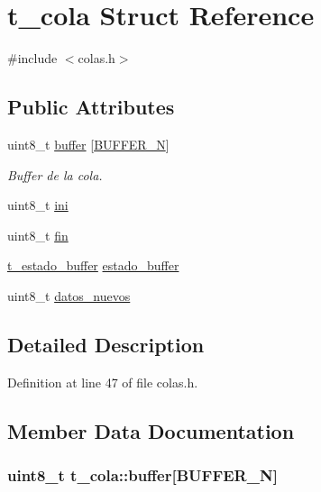 \hypertarget{structt__cola}{}\section{t\+\_\+cola Struct Reference}
\label{structt__cola}


{\ttfamily \#include $<$colas.\+h$>$}

\subsection*{Public Attributes}
\begin{DoxyCompactItemize}
\item 
uint8\+\_\+t \hyperlink{structt__cola_a036c41abaec1f17327ac2c8c797e131b}{buffer} \mbox{[}\hyperlink{colas_8h_ac71c7234de240e3781fe2467040fb3b0}{B\+U\+F\+F\+E\+R\+\_\+N}\mbox{]}
\begin{DoxyCompactList}\small\item\em Buffer de la cola. \end{DoxyCompactList}\item 
uint8\+\_\+t \hyperlink{structt__cola_ad3a0ddb896e8181a52ca74637016f1c7}{ini}
\item 
uint8\+\_\+t \hyperlink{structt__cola_a7a826546e1b03d5efc5ce211cc867008}{fin}
\item 
\hyperlink{colas_8h_adcf7b87b5431386461b2c790e786729a}{t\+\_\+estado\+\_\+buffer} \hyperlink{structt__cola_ad0292a1aa7a79b98d63083ed0d732df6}{estado\+\_\+buffer}
\item 
uint8\+\_\+t \hyperlink{structt__cola_ab28a0c32685544a21076d390d2d9f800}{datos\+\_\+nuevos}
\end{DoxyCompactItemize}


\subsection{Detailed Description}


Definition at line 47 of file colas.\+h.



\subsection{Member Data Documentation}
\subsubsection[{\texorpdfstring{buffer}{buffer}}]{\setlength{\rightskip}{0pt plus 5cm}uint8\+\_\+t t\+\_\+cola\+::buffer\mbox{[}{\bf B\+U\+F\+F\+E\+R\+\_\+N}\mbox{]}}\hypertarget{structt__cola_a036c41abaec1f17327ac2c8c797e131b}{}\label{structt__cola_a036c41abaec1f17327ac2c8c797e131b}


